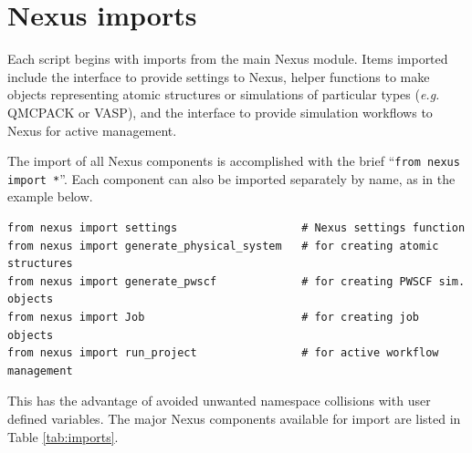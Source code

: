 \documentclass[oneside,11pt]{memoir}
\numberwithin{equation}{section}
\begin{document}
\section{Nexus imports}\label{sec:user_imports}
Each script begins with imports from the main Nexus module.  Items imported include the interface to provide settings to Nexus, helper functions to make objects representing atomic structures or simulations of particular types (\emph{e.g.} QMCPACK or VASP), and the interface to provide simulation workflows to Nexus for active management. 

The import of all Nexus components is accomplished with the brief ``\texttt{from nexus import *}''.  Each component can also be imported separately by name, as in the example below.
\begin{verbatim}
from nexus import settings                   # Nexus settings function
from nexus import generate_physical_system   # for creating atomic structures
from nexus import generate_pwscf             # for creating PWSCF sim. objects
from nexus import Job                        # for creating job objects
from nexus import run_project                # for active workflow management
\end{verbatim}

\noindent
This has the advantage of avoided unwanted namespace collisions with user defined variables.
The major Nexus components available for import are listed in Table \ref{tab:imports}.
\end{document}
